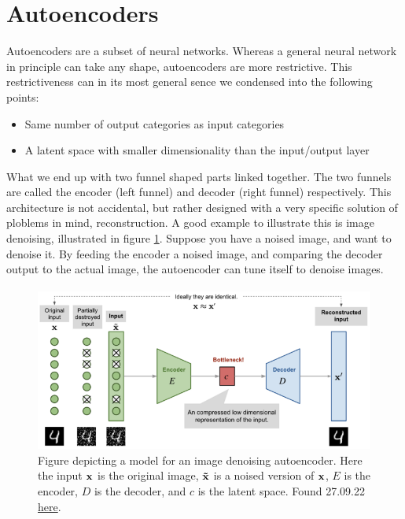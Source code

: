 \section{Autoencoders}
Autoencoders are a subset of neural networks. Whereas a general neural network
 in principle can take any shape, autoencoders are more restrictive.
This restrictiveness can in its most general sence we condensed 
into the following points:
\begin{itemize}
    \item Same number of output categories as input categories  
    \item A latent space with smaller dimensionality than the input/output layer  
\end{itemize}
What we end up with two funnel shaped parts linked together. The two funnels are 
called the encoder (left funnel) and decoder (right funnel) respectively. This architecture is not 
accidental, but rather designed with a very specific solution of ploblems in mind, reconstruction. 
A good example to illustrate this is image denoising, illustrated in figure \ref{fig:ae_denoise}. 
Suppose you have a noised image, and want to denoise it. By feeding the encoder a noised image, 
and comparing the decoder output to the actual image, the autoencoder can tune itself to denoise images. 

\begin{figure}
    \includegraphics[width=\linewidth]{Figures/Machinelearning/autoencoder_imagedenoising.png}
    \caption{Figure depicting a model for an image denoising autoencoder. Here the input $\bf{x}$ is the original image, $\bf{\tilde{x}}$ is a noised version of $\bf{x}$, $E$ is the encoder, $D$ is the decoder, and $c$ is the latent space. Found 27.09.22 \href{https://miro.medium.com/max/720/0*ECdHu2yeal38Jl3P.png}{here}. }
    \label{fig:ae_denoise}
\end{figure}

